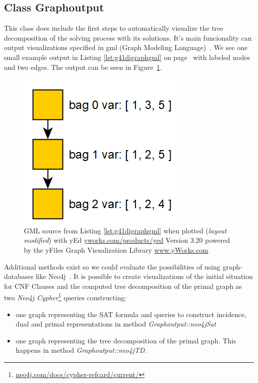 \documentclass[a4paper, 12pt, bibliography=totoc]{scrartcl}
\begin{document}
\subsection{Class Graphoutput}\label{sec:chagraphoutput}
This class does include the first steps to automatically visualize the tree decomposition of the solving process with its solutions.
It's main funcionality can output visualizations specified in gml (Graph Modeling Language)~\cite{Himsolt2010GMLAP}. We see one small example output in Listing \ref{lst:g41digraphgml} on page~\pageref{lst:g41digraphgml} with labeled nodes and two edges. The output can be seen in Figure~\ref{fig:gmlexamplepic}.

\begin{figure}[h]
	\centering
	\includegraphics[]{images/gmlexamplepic.png}
	\caption[GML example plotted with yEd]{GML source from Listing \ref{lst:g41digraphgml} when plotted (\textit{layout modified}) with yEd {\url{yworks.com/products/yed} Version 3.20 powered by the yFiles Graph Visualization Library \url{www.yWorks.com}} }
	\label{fig:gmlexamplepic}
\end{figure}
Additional methods exist so we could evaluate the possibilities of using graph-databases like Neo4j~\cite{graphdatabases}.
It is possible to create visualizations of the initial situation for CNF Clauses and the computed tree decomposition of the primal graph as two \textit{Neo4j Cypher}\footnote{\url{neo4j.com/docs/cypher-refcard/current/}} queries constructing:
\begin{itemize}[label=-]
	\item one graph representing the SAT formula and queries to construct incidence, dual and primal representations in method \textit{Graphoutput::neo4jSat}
	\item one graph representing the tree decomposition of the primal graph. This happens in method \textit{Graphoutput::neo4jTD}.
\end{itemize}
\end{document}
